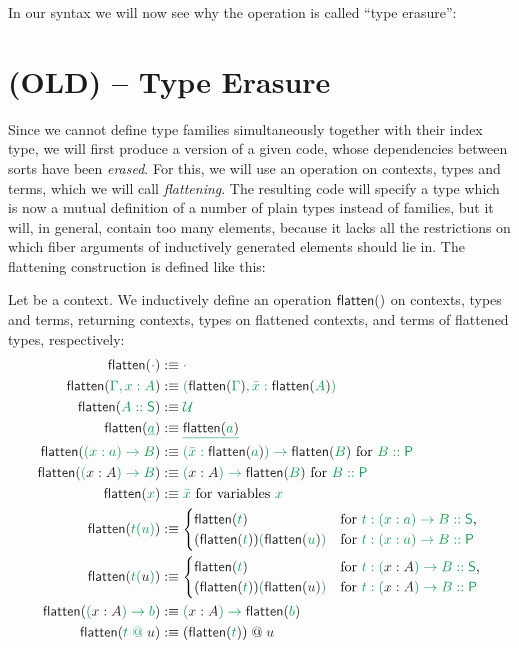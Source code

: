 \begin{example}
In our syntax we will now see why the operation is called ``type erasure'':
\end{example}

\section{(OLD) -- Type Erasure}

Since we cannot define type families simultaneously together with their index
type, we will first produce a version of a given code, whose dependencies between
sorts have been \emph{erased}.
For this, we will use an operation on contexts, types and terms, which we will
call \emph{flattening}.
The resulting code will specify a type which is now a mutual definition
of a number of plain types instead of families,
but it will, in general, contain too many elements, because it lacks all the
restrictions on which fiber arguments of inductively generated elements should
lie in.
The flattening construction is defined like this:

\begin{defn}[Flattening]
Let \grm{\Gamma} be a context. We inductively define an operation $\flatten{}$ on
contexts, types and terms, returning contexts, types on flattened contexts, and
terms of flattened types, respectively:
\begin{align*}
\flatten{\cdot}			&:\equiv \grm{\cdot} \\
\flatten{\Gamma, x : A}		&:\equiv \grm{(\flatten{\Gamma}, \bar{x} : \flatten{A})} \\ %
\flatten{A :: \Sc}		&:\equiv \grm{\UU} \\
\flatten{\underline{a}}		&:\equiv \grm{\underline{\flatten{\grm{a}}}} \\
\flatten{(x : a) \to B}		&:\equiv \grm{(\bar{x} : \flatten{a}) \to \flatten{B}} \text{ for \grm{B :: \Pc}} \\
\flatten{(\blm{x : A}) \to B}	&:\equiv \grm{(\blm{x : A}) \to \flatten{B}} \text{ for \grm{B :: \Pc}} \\
\flatten{x}				&:\equiv \grm{\bar{x}} \text{ for variables \grm{x}} \\
\flatten{t(u)}			&:\equiv
	\begin{cases}
	\flatten{t} & \text{for \grm{t : (x : a) \to B :: \Sc},} \\
	(\flatten{t})\grm{(\flatten{u})} & \text{for \grm{t : (x : a) \to B :: \Pc}}
	\end{cases} \\
\flatten{t(\blm{u})}		&:\equiv
	\begin{cases}
	\flatten{t} & \text{for \grm{t : (\blm{x : A}) \to B :: \Sc},} \\
	(\flatten{t})\grm{(\flatten{\blm{u}})} & \text{for \grm{t : (\blm{x : A}) \to B :: \Pc}}
	\end{cases} \\
\flatten{(\blm{x : A}) \to b}	&:\equiv \grm{(\blm{x : A}) \to \flatten{b}} \\
\flatten{t \app \blm{u}}	&:\equiv (\flatten{t}) \app \blm{u}
\end{align*}
\end{defn}

